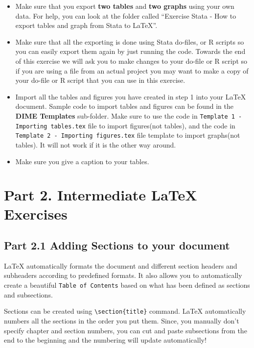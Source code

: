\documentclass[12pts]{report}
\begin{document}
\begin{itemize}
	\item Make sure that you export \textbf{two tables} and \textbf{two graphs} using your own data. For help, you can look at the folder called ``Exercise Stata - How to export tables and graph from Stata to LaTeX''.
	\item Make sure that all the exporting is done using Stata do-files, or R scripts so you can easily export them again by just running the code. Towards the end of this exercise we will ask you to make changes to your do-file or R script so if you are using a file from an actual project you may want to make a copy of your do-file or R script that you can use in this exercise.
	\item Import all the tables and figures you have created in step 1 into your {\LaTeX} document. Sample code to import tables and figures can be found in the \textbf{DIME Templates} sub-folder. Make sure to use the  code in \texttt{Template 1 - Importing tables.tex} file to import figures(not tables), and the code in \texttt{Template 2 - Importing figures.tex} file template to import graphs(not tables). It will not work if it is the other way around.
	\item Make sure you give a caption to your tables. 
\end{itemize}

\section*{Part 2. Intermediate {\LaTeX} Exercises}
\subsection*{Part 2.1 Adding Sections to your document}
{\LaTeX} automatically formats the document and different section headers and subheaders according to predefined formats. It also allows you to automatically create a beautiful \texttt{Table of Contents} based on what has been defined as sections and subsections. 

Sections can be created using \verb|\section{title}| command. {\LaTeX} automatically numbers all the sections in the order you put them. Since, you manually don't specify chapter and section numbers, you can cut and paste subsections from the end to the beginning and the numbering will update automatically! 
\end{document}
